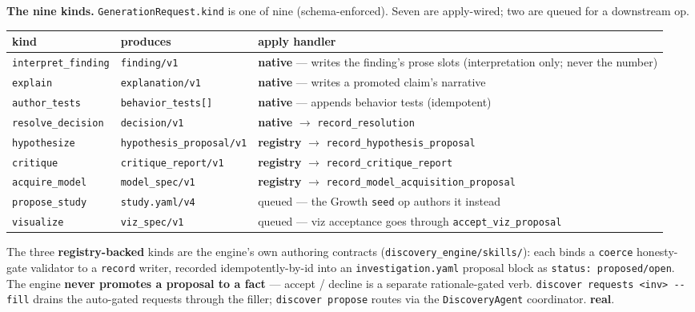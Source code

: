 \documentclass[11pt]{article}
\newcommand{\code}[1]{\texttt{\small #1}}
\newcommand{\real}{\textcolor{good}{\textbf{real}}}
\begin{document}
\noindent\textbf{The nine kinds.} \code{GenerationRequest.kind} is one of nine (schema-enforced).
Seven are apply-wired; two are queued for a downstream op.

\begin{center}\small
\begin{tabularx}{\textwidth}{@{}l l Y@{}}
\toprule
\textbf{kind} & \textbf{produces} & \textbf{apply handler}\\
\midrule
\code{interpret\_finding} & \code{finding/v1} & \textbf{native} --- writes the finding's prose slots (interpretation only; never the number)\\
\code{explain}           & \code{explanation/v1} & \textbf{native} --- writes a promoted claim's narrative\\
\code{author\_tests}     & \code{behavior\_tests[]} & \textbf{native} --- appends behavior tests (idempotent)\\
\code{resolve\_decision} & \code{decision/v1} & \textbf{native} $\rightarrow$ \code{record\_resolution}\\
\code{hypothesize}       & \code{hypothesis\_proposal/v1} & \textbf{registry} $\rightarrow$ \code{record\_hypothesis\_proposal}\\
\code{critique}          & \code{critique\_report/v1} & \textbf{registry} $\rightarrow$ \code{record\_critique\_report}\\
\code{acquire\_model}    & \code{model\_spec/v1} & \textbf{registry} $\rightarrow$ \code{record\_model\_acquisition\_proposal}\\
\code{propose\_study}    & \code{study.yaml/v4} & \textcolor{warn}{queued} --- the Growth \code{seed} op authors it instead\\
\code{visualize}         & \code{viz\_spec/v1} & \textcolor{warn}{queued} --- viz acceptance goes through \code{accept\_viz\_proposal}\\
\bottomrule
\end{tabularx}
\end{center}

\noindent The three \textbf{registry-backed} kinds are the engine's own authoring contracts
(\code{discovery\_engine/skills/}): each binds a \code{coerce} honesty-gate validator to a
\code{record} writer, recorded idempotently-by-id into an \code{investigation.yaml} proposal block
as \code{status: proposed/open}. The engine \textbf{never promotes a proposal to a fact} --- accept
/ decline is a separate rationale-gated verb. \code{discover requests <inv> -{}-fill} drains the
auto-gated requests through the filler; \code{discover propose} routes via the
\code{DiscoveryAgent} coordinator. \real.
\end{document}
